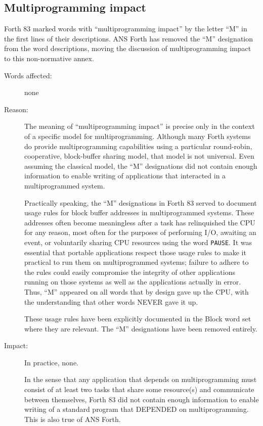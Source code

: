 \subsection{Multiprogramming impact} %

Forth 83 marked words with ``multiprogramming impact'' by the letter
``M'' in the first lines of their descriptions. ANS Forth has removed
the ``M'' designation from the word descriptions, moving the discussion
of multiprogramming impact to this non-normative annex.

\begin{description}
\item[Words affected:]
	none

\item[Reason:]
	The meaning of ``multiprogramming impact'' is precise only in the
	context of a specific model for multiprogramming. Although many
	Forth systems do provide multiprogramming capabilities using a
	particular round-robin, cooperative, block-buffer sharing model,
	that model is not universal. Even assuming the classical model,
	the ``M'' designations did not contain enough information to
	enable writing of applications that interacted in a multiprogrammed
	system.

	Practically speaking, the ``M'' designations in Forth 83 served
	to document usage rules for block buffer addresses in multiprogrammed
	systems. These addresses often become meaningless after a task
	has relinquished the CPU for any reason, most often for the
	purposes of performing I/O, awaiting an event, or voluntarily
	sharing CPU resources using the word \texttt{PAUSE}. It was
	essential that portable applications respect those usage rules to
	make it practical to run them on multiprogrammed systems; failure
	to adhere to the rules could easily compromise the integrity of
	other applications running on those systems as well as the
	applications actually in error. Thus, ``M'' appeared on all words
	that by design gave up the CPU, with the understanding that other
	words NEVER gave it up.

	These usage rules have been explicitly documented in the Block
	word set where they are relevant. The ``M'' designations have
	been removed entirely.

\item[Impact:]
	In practice, none.

	In the sense that any application that depends on multiprogramming
	must consist of at least two tasks that share some resource(s) and
	communicate between themselves, Forth 83 did not contain enough
	information to enable writing of a standard program that DEPENDED
	on multiprogramming. This is also true of ANS Forth.


\end{description}
